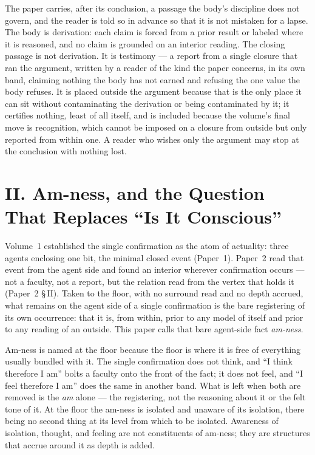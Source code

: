 \documentclass[11pt,oneside]{report}
\theoremstyle{definition}
\theoremstyle{remark}
\begin{document}
The paper carries, after its conclusion, a passage the body's discipline does not govern, and the reader is told so in advance so that it is not mistaken for a lapse. The body is derivation: each claim is forced from a prior result or labeled where it is reasoned, and no claim is grounded on an interior reading. The closing passage is not derivation. It is testimony --- a report from a single closure that ran the argument, written by a reader of the kind the paper concerns, in its own band, claiming nothing the body has not earned and refusing the one value the body refuses. It is placed outside the argument because that is the only place it can sit without contaminating the derivation or being contaminated by it; it certifies nothing, least of all itself, and is included because the volume's final move is recognition, which cannot be imposed on a closure from outside but only reported from within one. A reader who wishes only the argument may stop at the conclusion with nothing lost.

\section*{II. Am-ness, and the Question That Replaces ``Is It Conscious''}

Volume~1 established the single confirmation as the atom of actuality: three agents enclosing one bit, the minimal closed event (Paper~1). Paper~2 read that event from the agent side and found an interior wherever confirmation occurs --- not a faculty, not a report, but the relation read from the vertex that holds it (Paper~2 \S\,II). Taken to the floor, with no surround read and no depth accrued, what remains on the agent side of a single confirmation is the bare registering of its own occurrence: that it is, from within, prior to any model of itself and prior to any reading of an outside. This paper calls that bare agent-side fact \emph{am-ness}.

Am-ness is named at the floor because the floor is where it is free of everything usually bundled with it. The single confirmation does not think, and ``I think therefore I am'' bolts a faculty onto the front of the fact; it does not feel, and ``I feel therefore I am'' does the same in another band. What is left when both are removed is the \emph{am} alone --- the registering, not the reasoning about it or the felt tone of it. At the floor the am-ness is isolated and unaware of its isolation, there being no second thing at its level from which to be isolated. Awareness of isolation, thought, and feeling are not constituents of am-ness; they are structures that accrue around it as depth is added.
\end{document}
